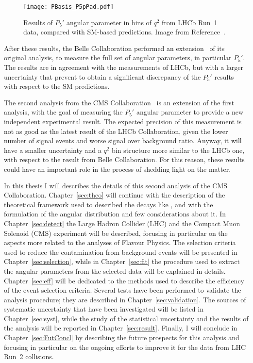 \begin{figure}[!hbt]
  \centering
  \texttt{[image: PBasis\_P5pPad.pdf]}
  \caption{Results of $P_5'$ angular parameter in bins of $q^2$ from LHCb Run~1 data, compared with SM-based predictions.
    Image from Reference~\cite{Aaij:2015oid}.}
  \label{fig:LHCb}
\end{figure}

After these results, the Belle Collaboration performed an extension~\cite{BelleP5p} of its original analysis, to measure the full set of angular parameters, in particular $P_5'$.
The results are in agreement with the measurements of LHCb, but with a larger uncertainty that prevent to obtain a significant discrepancy of the $P_5'$ results with respect to the SM predictions.

The second analysis from the CMS Collaboration~\cite{Sirunyan:2017dhj} is an extension of the first analysis, with the goal of measuring the $P_5'$ angular parameter to provide a new independent experimental result.
The expected precision of this measurement is not as good as the latest result of the LHCb Collaboration, given the lower number of signal events and worse signal over background ratio.
Anyway, it will have a smaller uncertainty and a $q^2$ bin structure more similar to the LHCb one, with respect to the result from Belle Collaboration.
For this reason, these results could have an important role in the process of shedding light on the matter.

In this thesis I will describes the details of this second analysis of the CMS Collaboration.
Chapter~\ref{sec:theo} will continue with the description of the theoretical framework used to described the decays like \BtoKstmumu, and with the formulation of the angular distribution and few considerations about it.
In Chapter~\ref{sec:detect} the Large Hadron Collider (LHC) and the Compact Muon Solenoid (CMS) experiment will be described, focusing in particular on the aspects more related to the analyses of Flavour Physics.
The selection criteria used to reduce the contamination from background events will be presented in Chapter~\ref{sec:selection}, while in Chapter~\ref{sec:fit} the procedure used to extract the angular parameters from the selected data will be explained in details.
Chapter~\ref{sec:eff} will be dedicated to the methods used to describe the efficiency of the event selection criteria.
Several tests have been performed to validate the analysis procedure; they are described in Chapter~\ref{sec:validation}.
The sources of systematic uncertainty that have been investigated will be listed in Chapter~\ref{sec:syst}, while the study of the statistical uncertainty and the results of the analysis will be reported in Chapter~\ref{sec:result}.
Finally, I will conclude in Chapter~\ref{sec:FutConcl} by describing the future prospects for this analysis and focusing in particular on the ongoing efforts to improve it for the data from LHC Run~2 collisions.

